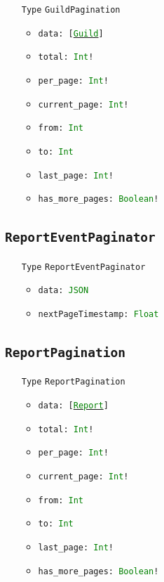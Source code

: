 \documentclass[10pt, a4paper]{memoir}
\numberwithin{equation}{section}
\theoremstyle{plain}
\theoremstyle{defp}
\theoremstyle{dotless}
\theoremstyle{definition}
\theoremstyle{dotless}
\theoremstyle{dotless}
\theoremstyle{defp}
\theoremstyle{defp}
\theoremstyle{be}          %
\theoremstyle{defp}
\newcommand\ttt[1]{\texttt{#1}}
\newcommand\type[1]{\ttt{\textcolor{green}{#1}}}
\begin{document}
\begin{itemize}[noitemsep,topsep=1pt]
\item[\ttt{Type}] \ttt{GuildPagination}
\begin{itemize}[itemsep=1pt,topsep=1pt]
\item \ttt{data: [\hyperref[sec:Guild]{\type{Guild}}]}
\item \ttt{total: \type{Int}!}
\item \ttt{per\_page: \type{Int}!}
\item \ttt{current\_page: \type{Int}!}
\item \ttt{from: \type{Int}}
\item \ttt{to: \type{Int}}
\item \ttt{last\_page: \type{Int}!}
\item \ttt{has\_more\_pages: \type{Boolean}!}
\end{itemize}
\end{itemize}

\subsection{\ttt{ReportEventPaginator}}\label{sec:reporteventpaginator}

\begin{itemize}[noitemsep,topsep=1pt]
\item[\ttt{Type}] \ttt{ReportEventPaginator}
\begin{itemize}[itemsep=1pt,topsep=1pt]
\item \ttt{data: \type{JSON}}
\item \ttt{nextPageTimestamp: \type{Float}}
\end{itemize}
\end{itemize}

\subsection{\ttt{ReportPagination}}\label{sec:reportpagination}

\begin{itemize}[noitemsep,topsep=1pt]
\item[\ttt{Type}] \ttt{ReportPagination}
\begin{itemize}[itemsep=1pt,topsep=1pt]
\item \ttt{data: [\hyperref[sec:Report]{\type{Report}}]}
\item \ttt{total: \type{Int}!}
\item \ttt{per\_page: \type{Int}!}
\item \ttt{current\_page: \type{Int}!}
\item \ttt{from: \type{Int}}
\item \ttt{to: \type{Int}}
\item \ttt{last\_page: \type{Int}!}
\item \ttt{has\_more\_pages: \type{Boolean}!}
\end{itemize}
\end{itemize}
\end{document}
